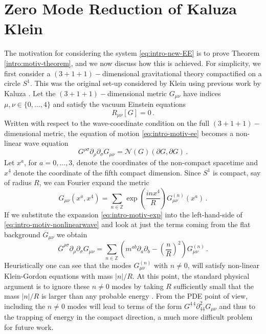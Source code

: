 \documentclass[11pt, a4paper]{amsart}
\numberwithin{equation}{section}
\numberwithin{theorem}{section}
\newcommand{\p}{\partial}
\newcommand{\mn}{{\mu \nu}}
\newcommand{\obar}{{\underline{4}}}
\newcommand{\gzero}{\overline{G}}
\begin{document}
\section{Zero Mode Reduction of Kaluza Klein} \label{section:intro-motiv-eg} 
The motivation for considering the system \eqref{eq:intro-new-EE} is to prove Theorem \ref{intro:motiv-theorem}, and we now discuss how this is achieved. For simplicity, we first consider a $(3+1+1)-$dimensional gravitational theory compactified on a circle $S^1$. This was the original set-up considered by Klein \cite{Klein1926} using previous work by Kaluza \cite{Kaluza}. Let the $(3+1+1)-$dimensional metric $G_\mn$ have indices $\mu, \nu \in \{ 0, \ldots, 4 \}$ and satisfy the vacuum Einstein equations
\begin{equation} R_\mn[G] = 0 \,. \label{eq:intro-motiv-ee} \end{equation}
Written with respect to the wave-coordinate condition on the full $(3+1+1)-$dimensional metric, the equation of motion \eqref{eq:intro-motiv-ee} becomes a non-linear wave equation 
\begin{equation} G^{\rho \sigma} \p_\rho \p_\sigma G_\mn = \mathcal{N}(G)(\p G, \p G) \,. \label{eq:intro-motiv-nonlinearwave} \end{equation}
Let $x^a$, for $a=0, \ldots, 3$, denote the coordinates of the non-compact spacetime and $x^\obar$ denote the coordinate of the fifth compact dimension. Since $S^1$ is compact, say of radius $R$, we can Fourier expand the metric
\begin{equation} G_\mn(x^a, x^\obar) = \sum_{n \in \mathbb{Z}} \exp \left( \frac{i n  x^\obar}{R} \right) G_\mn^{(n)}(x^a) \,. \label{eq:intro-motiv-exp} \end{equation}
If we substitute the expansion \eqref{eq:intro-motiv-exp} into the left-hand-side of \eqref{eq:intro-motiv-nonlinearwave} and look at just the terms coming from the flat background $\gzero_\mn$ we obtain
$$ \gzero^{\rho \sigma} \p_\rho \p_\sigma G_\mn = \sum_{n \in \mathbb{Z}} \left( m^{ab} \p_a \p_b - \left( \frac{n}{R} \right)^2 \right) G^{(n)}_\mn \,.$$
Heuristically one can see that the modes $G^{(n)}_\mn$ with $n \neq 0$, will satisfy non-linear Klein-Gordon equations with mass $\vert n \vert /R$. At this point, the standard physical argument is to ignore these $n \neq 0$ modes by taking $R$ sufficiently small that the mass $\vert n \vert /R$ is larger than any probable energy \cite{Pope}. 
From the PDE point of view, including the $n \neq 0$ modes will lead to terms of the form 
$ G^{\obar \, \obar} \p^2 _{\obar \obar}G_\mn$ and thus to the trapping of energy in the compact direction, a much more difficult problem for future work. 
\end{document}
